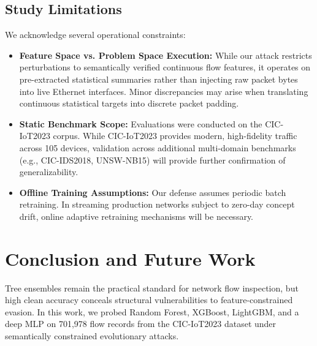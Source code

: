 \documentclass[final,5p,times,twocolumn]{elsarticle}
\begin{document}
\subsection{Study Limitations}
We acknowledge several operational constraints:
\begin{itemize}
    \item \textbf{Feature Space vs. Problem Space Execution:} While our attack restricts perturbations to semantically verified continuous flow features, it operates on pre-extracted statistical summaries rather than injecting raw packet bytes into live Ethernet interfaces. Minor discrepancies may arise when translating continuous statistical targets into discrete packet padding.
    \item \textbf{Static Benchmark Scope:} Evaluations were conducted on the CIC-IoT2023 corpus. While CIC-IoT2023 provides modern, high-fidelity traffic across 105 devices, validation across additional multi-domain benchmarks (e.g., CIC-IDS2018, UNSW-NB15) will provide further confirmation of generalizability.
    \item \textbf{Offline Training Assumptions:} Our defense assumes periodic batch retraining. In streaming production networks subject to zero-day concept drift, online adaptive retraining mechanisms will be necessary.
\end{itemize}

\section{Conclusion and Future Work}
\label{sec:conclusion}

Tree ensembles remain the practical standard for network flow inspection, but high clean accuracy conceals structural vulnerabilities to feature-constrained evasion. In this work, we probed Random Forest, XGBoost, LightGBM, and a deep MLP on 701,978 flow records from the CIC-IoT2023 dataset under semantically constrained evolutionary attacks.
\end{document}
